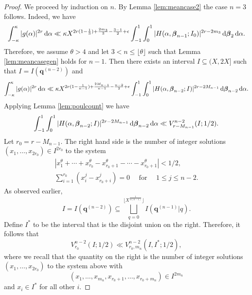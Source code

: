 \documentclass[11pt,reqno]{amsart}
\numberwithin{equation}{section}
\renewcommand{\d}{\,{\rm d}}
\begin{document}
\begin{proof} We proceed by induction on $n$. By Lemma \ref{lem:meancase2} the case $n=3$ follows. Indeed, we have
\[ \int_{-\kappa}^{\kappa} |g(\alpha)|^{2r} \d\alpha \ll \kappa X^{2r(1-\frac{1}{3})+\frac{2m_3}{3}-\frac{3-1}{2}+\epsilon} \int_{-1}^1 \int_0^1 |H(\alpha,\boldsymbol{\beta}_{n-1};I_0 )|^{2r-2m_3} \d \boldsymbol{\beta}_{2} \d \alpha. \]
Therefore, we assume $\theta > 4$ and let $3 < n \leq \lfloor \theta \rfloor$ such that Lemma \ref{lem:meancasegen} holds for $n-1$. Then there exists an interval $I \subseteq (X,2X]$ such that $I = I(\mathbf{q}^{(n-2)})$ and 
\[ \int_{-\kappa}^{\kappa} |g(\alpha)|^{2r} \d\alpha \ll \kappa X^{2r(1-\frac{1}{n-1})+\frac{2M_{n-1}}{n-1}-\frac{n-2}{2}+\epsilon} \int_{-1}^{1} \int_{0}^{1} |H(\alpha,\boldsymbol{\beta}_{n-2};I )|^{2r-2M_{n-1}} \d \boldsymbol{\beta}_{n-2} \d \alpha. \]
Applying Lemma \ref{lem:poulcount} we have 
\begin{align*} 
\int_{-1}^{1} \int_{0}^{1} |H(\alpha,\boldsymbol{\beta}_{n-2};I )|^{2r-2M_{n-1}} \d \boldsymbol{\beta}_{n-2} \d \alpha \ll V_{r-M_{n-1}}^{n-2}(I;1/2).
\end{align*}
Let $r_0 = r-M_{n-1}$. The right hand side is the number of integer solutions $(x_1,\ldots, x_{2r_0}) \in I^{2r_0}$ to the system 
\begin{equation} \label{eq:degminustwo}
\begin{aligned}
|x_1^{\theta}+\cdots+x_{r_0}^{\theta}-x_{r_0+1}^{\theta}-\cdots-x_{r_0+1}^{\theta}| < 1/2, 
\\
\sum_{i=1}^{r_0} (x_i^j-x_{r_0+i}^j) = 0 \quad \text{ for } \quad 1 \leq j \leq n-2.
\end{aligned}
\end{equation}
As observed earlier, 
\[ I = I(\mathbf{q}^{(n-2)}) \subseteq \bigsqcup_{q=0}^{\lfloor X^{\frac{1}{n(n-1)}} \rfloor} I({\mathbf{q}^{(n-1)}|q}). \]
Define $I^*$ to be the interval that is the disjoint union on the right. Therefore, it follows that 
\[ V_{r_0}^{n-2}(I;1/2) \ll V_{r_0,m_n}^{n-2}(I, I^* ;1/2), \]
where we recall that the quantity on the right is the number of integer solutions $(x_1,\ldots, x_{2r_0}) $ to the system above with
\[ (x_1,\ldots, x_{m_n}, x_{r_0+1},\ldots,x_{r_0+m_n}) \in I^{2m_n} \] 
and $x_i \in I^*$ for all other $i$. 


\end{proof}
\end{document}
